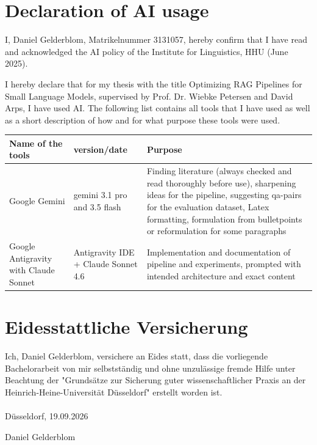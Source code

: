 \documentclass[12pt]{article} %
\begin{document}
\section*{Declaration of AI usage}

\noindent I, Daniel Gelderblom, Matrikelnummer 3131057, hereby confirm that I have read and acknowledged the AI policy of the Institute for Linguistics, HHU (June 2025).

\vspace{0.3cm}

\noindent I hereby declare that for my thesis with the title Optimizing RAG Pipelines for Small Language Models, supervised by Prof. Dr. Wiebke Petersen and David Arps, I have used AI. The following list contains all tools that I have used as well as a short description of how and for what purpose these tools were used.

\vspace{0.5cm}

\noindent
\renewcommand{\arraystretch}{1.3}
\begin{tabular}{|p{}|p{}|p{}|}
    \hline
    Name of the tools                     & version/date                        & Purpose                                                                                                                                                                 \\ \hline
    Google Gemini                         & gemini 3.1 pro and 3.5 flash        & Finding literature (always checked and read thoroughly before use), sharpening ideas for the pipeline, suggesting qa-pairs for the evaluation dataset, Latex formatting, formulation from bulletpoints or reformulation for some paragraphs \\ \hline
    Google Antigravity with Claude Sonnet & Antigravity IDE + Claude Sonnet 4.6 & Implementation and documentation of pipeline and experiments, prompted with intended architecture and exact content                                                     \\ \hline
\end{tabular}

\section*{Eidesstattliche Versicherung}

Ich, Daniel Gelderblom, versichere an Eides statt, dass die vorliegende Bachelorarbeit von mir selbstständig und ohne unzulässige fremde Hilfe unter Beachtung der "Grundsätze zur Sicherung guter wissenschaftlicher Praxis an der Heinrich-Heine-Universität Düsseldorf" erstellt worden ist.\\\\

Düsseldorf, 19.09.2026

Daniel Gelderblom

\newpage

\printbibliography[title={References}]
\end{document}
